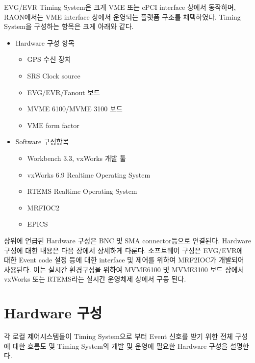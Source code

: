 \documentclass[11pt
  , a4paper
  , article
  , oneside
]{memoir}
\begin{document}
EVG/EVR Timing System은 크게 VME 또는 cPCI interface 상에서 동작하며, RAON에서는 VME interface 상에서 운영되는 플랫폼 구조를 채택하였다. Timing System을 구성하는 항목은 크게 아래와 같다.

\begin{itemize}
	\item Hardware 구성 항목
	\begin{itemize}
		\item GPS 수신 장치
		\item SRS Clock source
		\item EVG/EVR/Fanout 보드
		\item MVME 6100/MVME 3100 보드 
		\item VME form factor		
	\end{itemize}
	\item Software 구성항목
	\begin{itemize}
		\item Workbench 3.3, vxWorks 개발 툴
		\item vxWorks 6.9 Realtime Operating System
		\item RTEMS Realtime Operating System
		\item MRFIOC2  
		\item EPICS		
	\end{itemize}
\end{itemize}

상위에 언급된 Hardware 구성은 BNC 및 SMA connector등으로 연결된다. Hardware 구성에 대한 내용은 다음 장에서 상세하게 다룬다. 소프트웨어 구성은 EVG/EVR에 대한 Event code 설정 등에 대한 interface 및 제어를 위하여 MRF2IOC가 개발되어 사용된다. 이는 실시간 환경구성을 위하여 MVME6100 및 MVME3100 보드 상에서 vxWorks 또는 RTEMS라는 실시간 운영체제 상에서 구동 된다.

\chapter{Hardware 구성}
각 로컬 제어시스템들이 Timing System으로 부터 Event 신호를 받기 위한 전체 구성에 대한 흐름도 및 
Timing System의 개발 및 운영에 필요한 Hardware 구성을 설명한다.
\clearpage
\end{document}

